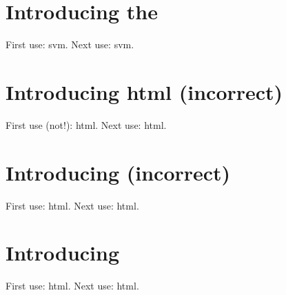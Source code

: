 \documentclass[12pt]{article}
\begin{document}
\tableofcontents
\section{Introducing the }
First use: \gls{svm}.
Next use: \gls{svm}. 

\section{Introducing \gls{html} (incorrect)}
First use (not!): \gls{html}.
Next use: \gls{html}. 

\section{Introducing  (incorrect)}
First use: \gls{html}.
Next use: \gls{html}.


\section{Introducing }
First use: \gls{html}.
Next use: \gls{html}.
\printglossaries 
\end{document}
